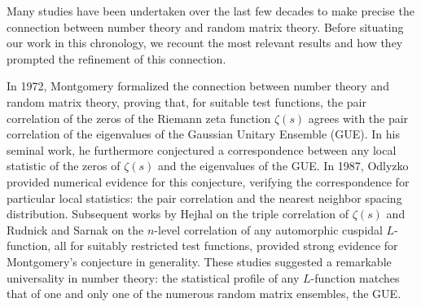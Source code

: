 \documentclass[12pt, reqno,oneside]{amsart}
\theoremstyle{plain}
\theoremstyle{definition}
\theoremstyle{remark}
\theoremstyle{plain}
\numberwithin{equation}{section}
\begin{document}
Many studies have been undertaken over the last few decades to make precise the connection between number theory and random matrix theory. Before situating our work in this chronology, we recount the most relevant results and how they prompted the refinement of this connection. 

In 1972, Montgomery \cite{Mon73} formalized the connection between number theory and random matrix theory, proving that, for suitable test functions, the pair correlation of the zeros of the Riemann zeta function $\zeta(s)$ agrees with the pair correlation of the eigenvalues of the Gaussian Unitary Ensemble (GUE). In his seminal work, he furthermore conjectured a correspondence between any local statistic of the zeros of $\zeta(s)$ and the eigenvalues of the GUE. In 1987, Odlyzko \cite{Odl87, Odl01} provided numerical evidence for this conjecture, verifying the correspondence for particular local statistics: the pair correlation and the nearest neighbor spacing distribution. Subsequent works by Hejhal \cite{Hej94} on the triple correlation of $\zeta(s)$ and Rudnick and Sarnak \cite{RS96} on the $n$-level correlation of any automorphic cuspidal $L$-function, all for suitably restricted test functions, provided strong evidence for Montgomery's conjecture in generality. These studies suggested a remarkable universality in number theory: the statistical profile of any $L$-function matches that of one and only one of the numerous random matrix ensembles, the GUE.
\end{document}
